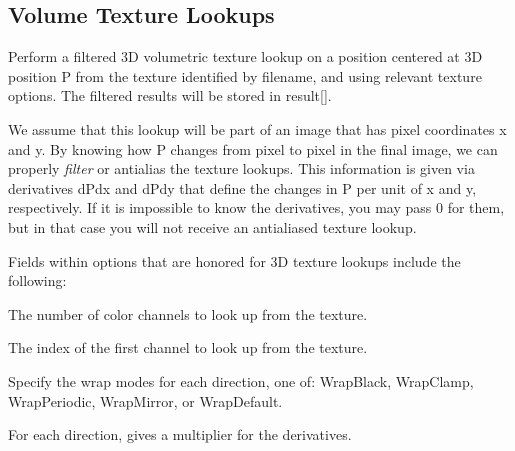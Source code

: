 \newpage
\subsection{Volume Texture Lookups}
\label{sec:texturesys:api:texture3d}


Perform a filtered 3D volumetric texture lookup on a position centered at
3D position {\cf P} from the texture identified by
{\cf filename}, and using relevant texture {\cf options}.  The filtered
results will be stored in {\cf result[]}.

We assume that this lookup will be part of an image that has pixel
coordinates {\cf x} and {\cf y}.  By knowing how {\cf P} changes from
pixel to pixel in the final image, we can properly \emph{filter} or
antialias the texture lookups.  This information is given via
derivatives {\cf dPdx} and {\cf dPdy} that define the changes in {\cf P}
per unit of {\cf x} and {\cf y}, respectively.  If it is impossible to
know the derivatives, you may pass 0 for them, but in that case you will
not receive an antialiased texture lookup.

Fields within {\cf options} that are honored for 3D texture lookups
include the following:

\vspace{-12pt}
\vspace{10pt}
The number of color channels to look up from the texture.
\apiend

\vspace{-24pt}
\vspace{10pt}
The index of the first channel to look up from the texture.
\apiend

\vspace{-24pt}
\vspace{10pt}
Specify the wrap modes for each direction, one of: 
{\cf WrapBlack}, {\cf WrapClamp}, {\cf WrapPeriodic}, {\cf WrapMirror},
or {\cf WrapDefault}.
\apiend

\vspace{-24pt}
\vspace{10pt}
For each direction, gives a multiplier for the derivatives.
\apiend

